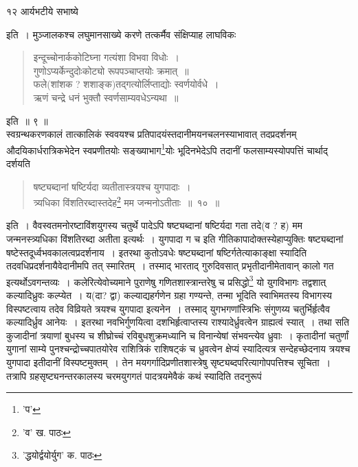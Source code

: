 \documentclass[11pt, openany]{book}
\begin{document}
\newpage

\vspace{3cm}
१२ \hspace{4cm}आर्यभटीये सभाष्ये

\vspace{0.3cm}
\noindent इति~। मुञ्जालकश्च लघुमानसाख्ये करणे तत्कर्मैव संक्षिप्याह लाघविकः\textendash

\begin{quote}
{\qt इन्दूच्चोनार्ककोटिघ्ना गत्यंशा विभवा विधोः~।\\
गुणोऽप्यर्केन्दुदोःकोट्यो रूपपञ्चाप्तयोः क्रमात्~॥\\
फले(शांशक ? शशाङ्क)तद्गत्योर्लिप्ताद्योः स्वर्णयोर्वधे~।\\
ऋणं चन्द्रे धनं भुक्तौ स्वर्णसाम्यवधेऽन्यथा~॥}  
\end{quote}
इति~॥ ९ ॥ \\

स्वग्रन्थकरणकालं तात्कालिकं स्ववयश्च प्रतिपादयंस्तदानीमयनचलनस्याभावात् तदप्रदर्शनम् औदयिकार्धरात्रिकभेदेन स्वप्रणीतयोः सङ्ख्याभाग\renewcommand{\thefootnote}{१}\footnote{'प'}योः भूदिनभेदेऽपि तदानीं फलसाम्यस्योपपत्तिं चार्थाद् दर्शयति\textendash 

\begin{quote}
{\ab षष्ट्यब्दानां षष्टिर्यदा व्यतीतास्त्रयश्च युगपादाः~।\\
त्र्यधिका विंशतिरब्दास्तदेह\renewcommand{\thefootnote}{२}\footnote{'व' ख. पाठः} मम जन्मनोऽतीताः~॥~१०~॥}
\end{quote}

इति~। वैवस्वतमनोरष्टाविंशयुगस्य चतुर्थे पादेऽपि षष्ट्यब्दानां षष्टिर्यदा गता तदे(व ? ह) मम जन्मनस्त्र्यधिका विंशतिरब्दा अतीता
इत्यर्थः~। {\qt युगपादा ग च} इति गीतिकापादोक्तस्येहाप्युक्तिः षष्ट्यब्दानां षष्टेस्तदूर्ध्वभवकालत्वप्रदर्शनाय~। इतरथा कुतोऽवधेः षष्ट्यब्दानां
षष्टिर्गतेत्याकाङ्क्षा स्यादिति तदवधिप्रदर्शनायैवेदानीमपि तत् स्मारितम्~। तस्माद् भारताद् गुरुदिवसात् प्रभृतीदानीमेतावान् कालो गत इत्यर्थोऽवगन्तव्यः~। कलेरित्येवोच्यमाने पुराणेषु गणितशास्त्रान्तरेषु च प्रसिद्धो\renewcommand{\thefootnote}{३}\footnote{'द्धयोर्द्वयोर्युग' क. पाठः} यो युगविभागः तद्वशात् कल्यादिध्रुवः कल्प्येत~। य(दा? द्वा) कल्याद्यहर्गणेन ग्रहा गण्यन्ते, तन्मा भूदिति स्वाभिमतस्य विभागस्य विस्पष्टत्वाय तदेव विव्रियते त्रयश्च
युगपादा इत्यनेन~। तस्माद् युगभगणांस्त्रिभिः संगुणय्य चतुर्भिर्हृत्वैव कल्यादिर्ध्रुव आनेयः~। इतरथा नवभिर्गुणयित्वा दशभिर्हृत्वाप्तस्य
राश्यादेर्ध्रुवत्वेन ग्राह्यत्वं स्यात्~। तथा सति कुजादीनां त्रयाणां बुधस्य च शीघ्रोच्चं रविबुधशुक्रमध्यानि च विनान्येषां संभवन्त्येव ध्रुवाः~। कृतादीनां चतुर्णां युगानां साम्ये पुनश्चन्द्रोच्चपातयोरेव राशित्रिकं राशिषट्कं च ध्रुवत्वेन क्षेप्यं स्यादित्यत्र सन्देहच्छेदनाय त्रयश्च युगपादा इतीदानीं
विस्पष्टमुक्तम्~। तेन मयगर्गादिप्रणीतशास्त्रेषु सृष्ट्यब्दपरित्यागोपपत्तिश्च सूचिता~। तत्रापि ग्रहसृष्ट्यनन्तरकालस्य चरमयुगगतं पादत्रयमेवैकं कथं स्यादिति तदनुरूपं
\end{document}
